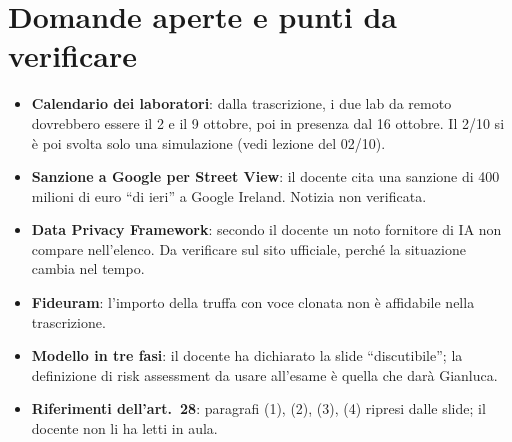 \section{Domande aperte e punti da verificare}
\begin{verifica}
\begin{itemize}
  \item \textbf{Calendario dei laboratori}: dalla trascrizione, i due lab da remoto dovrebbero essere il
    2 e il 9 ottobre, poi in presenza dal 16 ottobre. Il 2/10 si è poi svolta solo una simulazione (vedi
    lezione del 02/10).
  \item \textbf{Sanzione a Google per Street View}: il docente cita una sanzione di 400 milioni di euro
    ``di ieri'' a Google Ireland. Notizia non verificata.
  \item \textbf{Data Privacy Framework}: secondo il docente un noto fornitore di IA non compare
    nell'elenco. Da verificare sul sito ufficiale, perché la situazione cambia nel tempo.
  \item \textbf{Fideuram}: l'importo della truffa con voce clonata non è affidabile nella trascrizione.
  \item \textbf{Modello in tre fasi}: il docente ha dichiarato la slide ``discutibile''; la definizione
    di risk assessment da usare all'esame è quella che darà Gianluca.
  \item \textbf{Riferimenti dell'art.~28}: paragrafi (1), (2), (3), (4) ripresi dalle slide; il docente
    non li ha letti in aula.
\end{itemize}
\end{verifica}
